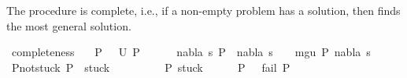 \begin{isabellebody}
\begin{isamarkuptext}
The procedure is complete, i.e., if a non-empty problem has a solution, then  finds
the most general solution.%
\end{isamarkuptext}\isamarkuptrue%
\isamarkupfalse%
\ completeness{\isacharcolon}{\kern0pt}\isanewline
\ \ \ {\isachardoublequoteopen}P{}\ {\isasymnoteq}\ {\isacharparenleft}{\kern0pt}{\isacharbrackleft}{\kern0pt}{\isacharbrackright}{\kern0pt}{\isacharcomma}{\kern0pt}{\isacharbrackleft}{\kern0pt}{\isacharbrackright}{\kern0pt}{\isacharparenright}{\kern0pt}{\isachardoublequoteclose}\ {\isachardoublequoteopen}U\ P{}\ {\isasymnoteq}\ {\isacharbraceleft}{\kern0pt}{\isacharbraceright}{\kern0pt}{\isachardoublequoteclose}\isanewline
\ \ \ {\isachardoublequoteopen}{\isasymexists}\ nabla{\isacharprime}{\kern0pt}\ s{\isacharprime}{\kern0pt}{\isachardot}{\kern0pt}\ P{}\ {\isasymTurnstile}\ {\isacharparenleft}{\kern0pt}nabla{\isacharprime}{\kern0pt}{\isacharcomma}{\kern0pt}\ s{\isacharprime}{\kern0pt}{\isacharparenright}{\kern0pt}\ {\isasymRightarrow}\ {\isacharparenleft}{\kern0pt}{\isacharbrackleft}{\kern0pt}{\isacharbrackright}{\kern0pt}{\isacharcomma}{\kern0pt}{\isacharbrackleft}{\kern0pt}{\isacharbrackright}{\kern0pt}{\isacharparenright}{\kern0pt}\ {\isasymand}\ mgu\ P{}\ {\isacharparenleft}{\kern0pt}nabla{\isacharprime}{\kern0pt}{\isacharcomma}{\kern0pt}\ s{\isacharprime}{\kern0pt}{\isacharparenright}{\kern0pt}{\isachardoublequoteclose}\isanewline
%
\isadelimproof
%
\endisadelimproof
%
\isatagproof
{}\isamarkupfalse%
{\isacharminus}{\kern0pt}\isanewline
\ \ \isamarkupfalse%
\ P{}{\isacharunderscore}{\kern0pt}not{\isacharunderscore}{\kern0pt}stuck{\isacharcolon}{\kern0pt}\ {\isachardoublequoteopen}P{}\ {\isasymnotin}\ stuck{\isachardoublequoteclose}\ \isanewline
\ \ \isamarkupfalse%
\isanewline
\ \ \ \ \isamarkupfalse%
\ {\isachardoublequoteopen}P{}{\isasymin}\ stuck{\isachardoublequoteclose}\isanewline
\ \ \ \ \isamarkupfalse%
\ {\isachardoublequoteopen}P{}\ {\isacharequal}{\kern0pt}\ {\isacharparenleft}{\kern0pt}{\isacharbrackleft}{\kern0pt}{\isacharbrackright}{\kern0pt}{\isacharcomma}{\kern0pt}{\isacharbrackleft}{\kern0pt}{\isacharbrackright}{\kern0pt}{\isacharparenright}{\kern0pt}{\isasymor}\ fail\ P{}{\isachardoublequoteclose}\ \isanewline
\ \ \ \ \ \ \isamarkupfalse%

\end{isabellebody}
